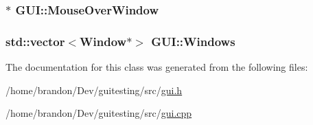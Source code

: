 \hypertarget{class_g_u_i_88c450e5cfd3288d0734b7c00a156916}{
\subsubsection[{MouseOverWindow}]{$\ast$ {\bf GUI::MouseOverWindow}}}
\label{class_g_u_i_88c450e5cfd3288d0734b7c00a156916}


\hypertarget{class_g_u_i_cf6ff30e45106fbc8cc363cc7a8f5234}{
\subsubsection[{Windows}]{\setlength{\rightskip}{0pt plus 5cm}std::vector$<${\bf Window}$\ast$$>$ {\bf GUI::Windows}}}
\label{class_g_u_i_cf6ff30e45106fbc8cc363cc7a8f5234}




The documentation for this class was generated from the following files:\begin{CompactItemize}
\item 
/home/brandon/Dev/guitesting/src/\hyperlink{gui_8h}{gui.h}\item 
/home/brandon/Dev/guitesting/src/\hyperlink{gui_8cpp}{gui.cpp}\end{CompactItemize}
